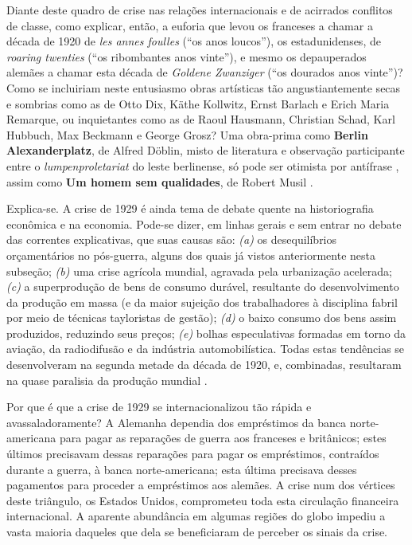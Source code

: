 Diante deste quadro de crise nas relações internacionais e de acirrados conflitos de classe, como explicar, então, a euforia que levou os franceses a chamar a década de 1920 de \textit{les annes foulles} (``os anos loucos''), os estadunidenses, de \textit{roaring twenties} (``os ribombantes anos vinte''), e mesmo os depauperados alemães a chamar esta década de \textit{Goldene Zwanziger} (``os dourados anos vinte'')? Como se incluiriam neste entusiasmo obras artísticas tão angustiantemente secas e sombrias como as de Otto Dix, Käthe Kollwitz, Ernst Barlach e Erich Maria Remarque, ou inquietantes como as de Raoul Hausmann, Christian Schad, Karl Hubbuch, Max Beckmann e George Grosz? Uma obra-prima como \textbf{Berlin Alexanderplatz}, de Alfred Döblin, misto de literatura e observação participante entre o \textit{lumpenproletariat} do leste berlinense, só pode ser otimista por antífrase \cite{doblin_alexanderplatz_2009}, assim como \textbf{Um homem sem qualidades}, de Robert Musil \cite{musil_quali_1989}.

Explica-se. A crise de 1929 é ainda tema de debate quente na historiografia econômica e na economia. Pode-se dizer, em linhas gerais e sem entrar no debate das correntes explicativas, que suas causas são: \textit{(a)} os desequilíbrios orçamentários no pós-guerra, alguns dos quais já vistos anteriormente nesta subseção; \textit{(b)} uma crise agrícola mundial, agravada pela urbanização acelerada; \textit{(c)} a superprodução de bens de consumo durável, resultante do desenvolvimento da produção em massa (e da maior sujeição dos trabalhadores à disciplina fabril por meio de técnicas tayloristas de gestão); \textit{(d)} o baixo consumo dos bens assim produzidos, reduzindo seus preços; \textit{(e)} bolhas especulativas formadas em torno da aviação, da radiodifusão e da indústria automobilística. Todas estas tendências se desenvolveram na segunda metade da década de 1920, e, combinadas, resultaram na quase paralisia da produção mundial \cite{gazier_1929_2009,hautcoeur_1929_2009}.

Por que é que a crise de 1929 se internacionalizou tão rápida e avassaladoramente? A Alemanha dependia dos empréstimos da banca norte-americana para pagar as reparações de guerra aos franceses e britânicos; estes últimos precisavam dessas reparações para pagar os empréstimos, contraídos durante a guerra, à banca norte-americana; esta última precisava desses pagamentos para proceder a empréstimos aos alemães. A crise num dos vértices deste triângulo, os Estados Unidos, comprometeu toda esta circulação financeira internacional. A aparente abundância em algumas regiões do globo impediu a vasta maioria daqueles que dela se beneficiaram de perceber os sinais da crise.

